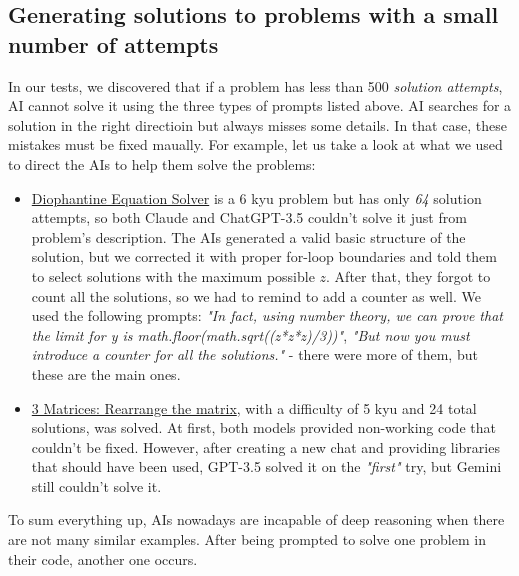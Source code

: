 \documentclass[12pt]{report}
\begin{document}
	\subsection{Generating solutions to problems with a small number of attempts}
		\qquad In our tests, we discovered that if a problem has less than 500 \textit{solution attempts}, AI cannot solve it using the three types of prompts listed above. AI searches for a solution in the right directioin but always misses some details. In that case, these mistakes must be fixed maually. For example, let us take a look at what we used to direct the AIs to help them solve the problems:

		\begin{itemize}
			\item\href{https://www.codewars.com/kata/57e32bb7ec7d241045000661}{Diophantine Equation Solver} is a 6 kyu problem but has only \textit{64} solution attempts, so both Claude and ChatGPT-3.5 couldn't solve it just from problem's description. The AIs generated a valid basic structure of the solution, but we corrected it with proper for-loop boundaries and told them to select solutions with the maximum possible $z$. After that, they forgot to count all the solutions, so we had to remind to add a counter as well. We used the following prompts: \textit{"In fact, using number theory, we can prove that the limit for y is math.floor(math.sqrt((z*z*z)/3))"}, \textit{"But now you must introduce a counter for all the solutions."} - there were more of them, but these are the main ones.
			\item\href{https://www.codewars.com/kata/5901aee0af945e3a35000068/train/python}{3 Matrices: Rearrange the matrix}, with a difficulty of 5 kyu and 24 total solutions, was solved. At first, both models provided non-working code that couldn't be fixed. However, after creating a new chat and providing libraries that should have been used, GPT-3.5 solved it on the \textit{"first"} try, but Gemini still couldn't solve it.

		\end{itemize}


		To sum everything up, AIs nowadays are incapable of deep reasoning when there are not many similar examples. After being prompted to solve one problem in their code, another one occurs.
\end{document}
